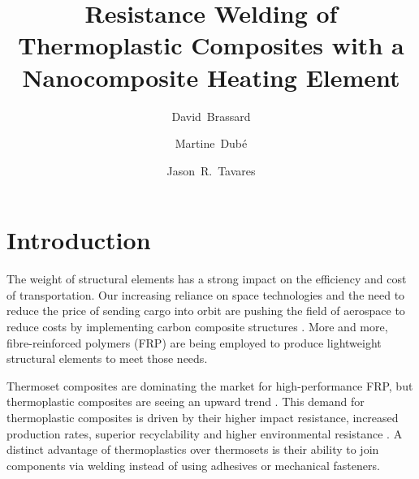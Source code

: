 \documentclass[11pt,review,times]{elsarticle}
\begin{document}


\title{Resistance Welding of Thermoplastic Composites with a Nanocomposite Heating Element}

\author[polymtl,crepec]{David~Brassard}
\author[ets,crepec]{Martine~Dubé}
\author[polymtl,crepec]{Jason~R.~Tavares}


\address[polymtl]{Department of Chemical Engineering, Polytechnique Montréal, P.O. Box 6079 Station Centre-Ville, Montréal, QC, H3C 3A7, Canada}
\address[ets]{Department of Mechanical Engineering, École de technologie supérieure, 1100 Notre-Dame Street West, Montréal, Québec, Canada, H3C 1K3}
\address[crepec]{Research Center for High Performance Polymer and Composite Systems (CREPEC), Polytechnique Montréal, P.O. Box 6079 Station Centre-Ville, Montréal, QC, H3C 3A7, Canada}

\begin{abstract}

\end{abstract}

\begin{keyword}

\end{keyword}

\maketitle


							\section{Introduction}

The weight of structural elements has a strong impact on the efficiency and cost of transportation. 
Our increasing reliance on space technologies and the need to reduce the price of sending cargo into orbit are pushing the field of aerospace to reduce costs by implementing carbon composite structures \cite{Williams2003,Timmis2015}. 
More and more, fibre-reinforced polymers (FRP) are being employed to produce lightweight structural elements to meet those needs. 

Thermoset composites are dominating the market for high-performance FRP, but thermoplastic composites are seeing an upward trend \cite{CompositeWorldSloan2018}. 
This demand for thermoplastic composites is driven by their higher impact resistance, increased production rates, superior recyclability and higher environmental resistance \cite{cogswell1992}. 
A distinct advantage of thermoplastics over thermosets is their ability to join components via welding instead of using adhesives or mechanical fasteners. 
\end{document}
